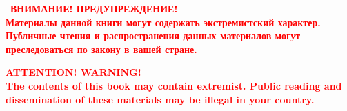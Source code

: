 \pagecolor{black}
\vspace*{\fill}
\begin{center}
\
\textbf{\textcolor{red}{\Large\MakeUppercase{Внимание! Предупреждение!}\large\\
Материалы данной книги могут содержать экстремистский характер. 
Публичные чтения и распространения данных материалов могут преследоваться по закону в вашей стране.}}\\
\vspace*{2cm}

\textbf{\textcolor{red}{\Large\uppercase{Attention! Warning!}\large\\
The contents of this book may contain extremist.
Public reading and dissemination of these materials may be illegal in your country.}}
\end{center}
\vspace*{\fill}
